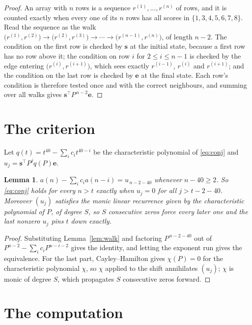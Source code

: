 \documentclass[11pt,a4paper]{article}
\theoremstyle{plain}
\newtheorem{lemma}[theorem]{Lemma}
\theoremstyle{definition}
\begin{document}
\begin{proof}
An array with $n$ rows is a sequence $r^{(1)},\dots,r^{(n)}$ of rows, and it is counted
exactly when every one of its $n$ rows has all scores in $\{1,3,4,5,6,7,8\}$. Read the sequence as the
walk $\bigl(r^{(1)},r^{(2)}\bigr)\to\bigl(r^{(2)},r^{(3)}\bigr)\to\cdots\to
\bigl(r^{(n-1)},r^{(n)}\bigr)$, of length $n-2$. The condition on the first row is
checked by $\mathbf{s}$ at the initial state, because a first row has no row above it; the
condition on row $i$ for $2\le i\le n-1$ is checked by the edge entering
$\bigl(r^{(i)},r^{(i+1)}\bigr)$, which sees exactly $r^{(i-1)}$, $r^{(i)}$ and
$r^{(i+1)}$; and the condition on the last row is checked by $\mathbf{e}$ at the final
state. Each row's condition is therefore tested once and with the correct neighbours, and
summing over all walks gives $\mathbf{s}^{\!\top}P^{\,n-2}\mathbf{e}$.
\end{proof}

\section{The criterion}

Let $q(t)=t^{40}-\sum_i c_i t^{40-i}$ be the characteristic polynomial of
\eqref{eq:conj} and $u_j=\mathbf{s}^{\!\top}P^{j}q(P)\mathbf{e}$.

\begin{lemma}\label{lem:crit}
$a(n)-\sum_i c_i a(n-i)=u_{\,n-2-40}$ whenever $n-40\ge2$. So \eqref{eq:conj}
holds for every $n>t$ exactly when $u_j=0$ for all $j>t-2-40$. Moreover $(u_j)$
satisfies the monic linear recurrence given by the characteristic polynomial of $P$, of
degree $S$, so $S$ consecutive zeros force every later one and the last nonzero $u_j$ pins
$t$ down exactly.
\end{lemma}

\begin{proof}
Substituting Lemma~\ref{lem:walk} and factoring $P^{\,n-2-40}$ out of
$P^{n-2}-\sum_i c_i P^{n-i-2}$ gives the identity, and letting the exponent run gives the
equivalence. For the last part, Cayley--Hamilton gives $\chi(P)=0$ for the characteristic
polynomial $\chi$, so $\chi$ applied to the shift annihilates $(u_j)$; $\chi$ is monic of
degree $S$, which propagates $S$ consecutive zeros forward.
\end{proof}

\section{The computation}
\end{document}
